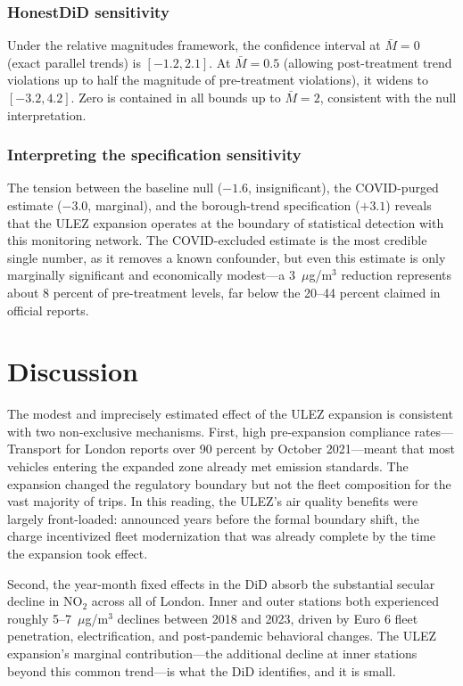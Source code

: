 \documentclass[12pt]{article}
\begin{document}
\subsubsection*{HonestDiD sensitivity} Under the \citet{rambachanRoth2023} relative magnitudes framework, the confidence interval at $\bar{M} = 0$ (exact parallel trends) is $[-1.2, 2.1]$. At $\bar{M} = 0.5$ (allowing post-treatment trend violations up to half the magnitude of pre-treatment violations), it widens to $[-3.2, 4.2]$. Zero is contained in all bounds up to $\bar{M} = 2$, consistent with the null interpretation.

\subsubsection*{Interpreting the specification sensitivity} The tension between the baseline null ($-1.6$, insignificant), the COVID-purged estimate ($-3.0$, marginal), and the borough-trend specification ($+3.1$) reveals that the ULEZ expansion operates at the boundary of statistical detection with this monitoring network. The COVID-excluded estimate is the most credible single number, as it removes a known confounder, but even this estimate is only marginally significant and economically modest---a 3~$\mu$g/m$^3$ reduction represents about 8 percent of pre-treatment levels, far below the 20--44 percent claimed in official reports.


\section{Discussion}

The modest and imprecisely estimated effect of the ULEZ expansion is consistent with two non-exclusive mechanisms. First, high pre-expansion compliance rates---Transport for London reports over 90 percent by October 2021---meant that most vehicles entering the expanded zone already met emission standards. The expansion changed the regulatory boundary but not the fleet composition for the vast majority of trips. In this reading, the ULEZ's air quality benefits were largely front-loaded: announced years before the formal boundary shift, the charge incentivized fleet modernization that was already complete by the time the expansion took effect.

Second, the year-month fixed effects in the DiD absorb the substantial secular decline in NO$_2$ across all of London. Inner and outer stations both experienced roughly 5--7~$\mu$g/m$^3$ declines between 2018 and 2023, driven by Euro 6 fleet penetration, electrification, and post-pandemic behavioral changes. The ULEZ expansion's marginal contribution---the additional decline at inner stations beyond this common trend---is what the DiD identifies, and it is small.
\end{document}
